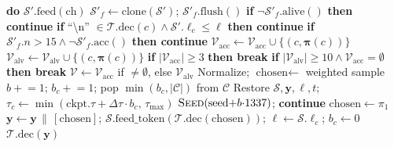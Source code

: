 \documentclass[11pt]{article}
\begin{document}
\begin{algorithm}[H]
\begin{algorithmic}[1]
               \textbf{do} $\mathcal{S}'.\text{feed}(
               \text{ch})$
        \State $\mathcal{S}'_f \gets
               \text{clone}(\mathcal{S}')$;\;
               $\mathcal{S}'_f.\text{flush}()$
        \State \textbf{if} $\neg\mathcal{S}'_f
               .\text{alive}()$
               \textbf{then continue}
        \State \textbf{if} ``\textbackslash n''
               $\in \mathcal{T}.\text{dec}(c) \wedge
               \mathcal{S}'.\ell_c \le \ell$
               \textbf{then continue}
        \State \textbf{if} $\mathcal{S}'_f.n > 15
               \wedge \neg\mathcal{S}'_f.\text{acc}()$
               \textbf{then continue}
            \State $\mathcal{V}_{\text{acc}} \gets
                   \mathcal{V}_{\text{acc}} \cup
                   \{(c, \boldsymbol{\pi}(c))\}$
        \EndIf
        \State $\mathcal{V}_{\text{alv}} \gets
               \mathcal{V}_{\text{alv}} \cup
               \{(c, \boldsymbol{\pi}(c))\}$
        \State \textbf{if} $|\mathcal{V}_{\text{acc}}|
               \ge 3$ \textbf{then break}
        \State \textbf{if} $|\mathcal{V}_{\text{alv}}|
               \ge 10 \wedge
               \mathcal{V}_{\text{acc}} = \emptyset$
               \textbf{then break}
    \EndFor
    \State {}
    \State $\mathcal{V} \gets
           \mathcal{V}_{\text{acc}}$ if $\neq\emptyset$,
           else $\mathcal{V}_{\text{alv}}$
        \State Normalize;\;
               $\text{chosen} \gets$ weighted sample
        \State $b \mathrel{+}= 1$;\;
               $b_c \mathrel{+}= 1$;\;
               pop $\min(b_c, |\mathcal{C}|)$
               from $\mathcal{C}$
        \State Restore $\mathcal{S}, \mathbf{y},
               \ell, t$;\;
               $\tau_c \gets \min(\text{ckpt}.\tau
               {+} \Delta\tau {\cdot} b_c,\,
               \tau_{\max})$
        \State $\textsc{Seed}(\text{seed}
               {+} b {\cdot} 1337)$;\;
               \textbf{continue}
    \Else
        \State $\text{chosen} \gets \pi_1$
    \EndIf
    \State $\mathbf{y} \gets \mathbf{y} \,\|\,
           [\text{chosen}]$;\;
           $\mathcal{S}.\text{feed\_token}(
           \mathcal{T}.\text{dec}(\text{chosen}))$;\;
           $\ell \gets \mathcal{S}.\ell_c$;\;
           $b_c \gets 0$
\EndFor
\State \Return $\mathcal{T}.\text{dec}(\mathbf{y})$
\end{algorithmic}
\end{algorithm}
\end{document}
